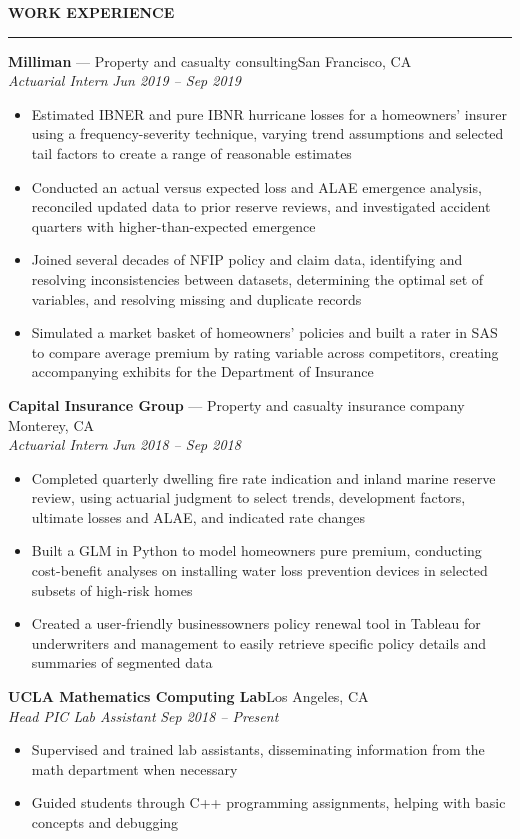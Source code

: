 \documentclass[11pt,letterpaper]{article}
\newcommand{\sectline}{\vspace{4pt}\hrule height 1.5pt\vspace{4pt}}
\newcommand{\sectspace}{\vspace{10pt}}
\newcommand{\smallspace}{\vspace{5pt}}
\begin{document}
\textbf{WORK EXPERIENCE}\sectline
\textbf{Milliman} --- Property and casualty consulting\hfill San Francisco, CA \\
\textit{Actuarial Intern} \hfill \textit{Jun 2019 -- Sep 2019}
\begin{itemize}
	\item Estimated IBNER and pure IBNR hurricane losses for a homeowners' insurer using a frequency-severity technique, varying trend assumptions and selected tail factors to create a range of reasonable estimates
	\item Conducted an actual versus expected loss and ALAE emergence analysis, reconciled updated data to prior reserve reviews, and investigated accident quarters with higher-than-expected emergence 
	\item Joined several decades of NFIP policy and claim data, identifying and resolving inconsistencies between datasets, determining the optimal set of variables, and resolving missing and duplicate records
	\item Simulated a market basket of homeowners' policies and built a rater in SAS to compare average premium by rating variable across competitors, creating accompanying exhibits for the Department of Insurance
\end{itemize}
\smallspace 
\textbf{Capital Insurance Group} --- Property and casualty insurance company \hfill Monterey, CA \\
\textit{Actuarial Intern} \hfill \textit{Jun 2018 -- Sep 2018}
\begin{itemize}
	\item Completed quarterly dwelling fire rate indication and inland marine reserve review, using actuarial judgment to select trends, development factors, ultimate losses and ALAE, and indicated rate changes
	\item Built a GLM in Python to model homeowners pure premium, conducting cost-benefit analyses on installing water loss prevention devices in selected subsets of high-risk homes 
	\item Created a user-friendly businessowners policy renewal tool in Tableau for underwriters and management to easily retrieve specific policy details and summaries of segmented data	
\end{itemize}
\smallspace 
\textbf{UCLA Mathematics Computing Lab}\hfill Los Angeles, CA \\
\textit{Head PIC Lab Assistant} \hfill \textit{Sep 2018 -- Present} \\
\begin{itemize}
	\item Supervised and trained lab assistants, disseminating information from the math department when necessary
	\item Guided students through C++ programming assignments, helping with basic concepts and debugging
\end{itemize}
\sectspace
\end{document}
